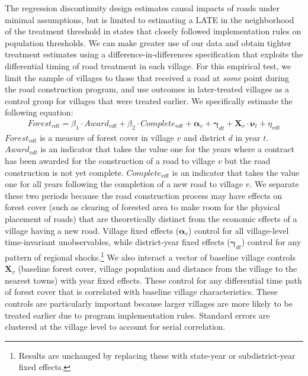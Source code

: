 The regression discontinuity design estimates causal impacts of roads
under minimal assumptions, but is limited to estimating a LATE in the
neighborhood of the treatment threshold in states that closely
followed implementation rules on population thresholds. We can make
greater use of our data and obtain tighter treatment estimates using a
difference-in-differences specification that exploits the differential
timing of road treatment in each village. For this empirical test, we
limit the sample of villages to those that received a road at
\textit{some} point during the road construction program, and use
outcomes in later-treated villages as a control group for villages
that were treated earlier.  We specifically estimate the following
equation:
%
\begin{align} 
\label{eq:rr1} 
Forest_{vdt} = \beta_1 \cdot Award_{vdt} +  \beta_2\cdot
Complete_{vdt} + \boldsymbol \alpha_v + \boldsymbol \gamma_{dt} + \boldsymbol
X_v \cdot \boldsymbol \nu_{t} + \eta_{vdt} 
\end{align}
%
\noindent
$Forest_{vdt}$ is a measure of forest cover in village $v$ and
district $d$ in year $t$. $Award_{vdt}$ is an indicator that takes the
value one for the years where a contract has been awarded for the
construction of a road to village $v$ but the road construction is not
yet complete. $Complete_{vdt}$ is an indicator that takes the value
one for all years following the completion of a new road to village
$v$. We separate these two periods because the road construction
process may have effects on forest cover (such as clearing of forested
area to make room for the physical placement of roads) that are
theoretically distinct from the economic effects of a village having a
new road. Village fixed effects ($\boldsymbol \alpha_v$) control for
all village-level time-invariant unobservables, while district-year
fixed effects ($\boldsymbol \gamma_{dt}$) control for any pattern of
regional shocks.\footnote{Results are unchanged by replacing these
  with state-year or subdistrict-year fixed effects.}  We also
interact a vector of baseline village controls $\boldsymbol X_v$
(baseline forest cover, village population and distance from the
village to the nearest towns) with year fixed effects. These control
for any differential time path of forest cover that is correlated with
baseline village characteristics. These controls are particularly
important because larger villages are more likely to be treated
earlier due to program implementation rules.  Standard errors are
clustered at the village level to account for serial correlation.

